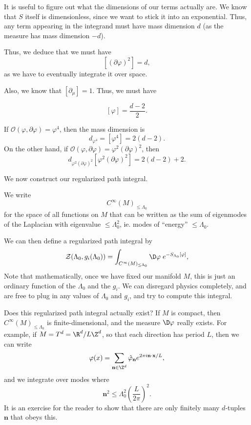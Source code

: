 \documentclass[a4paper]{article}
\begin{document}
It is useful to figure out what the dimensions of our terms actually are. We know that $S$ itself is dimensionless, since we want to stick it into an exponential. Thus, any term appearing in the integrand must have mass dimension $d$ (as the measure has mass dimension $-d$).

Thus, we deduce that we must have
\[
  [(\partial \varphi)^2] = d,
\]
as we have to eventually integrate it over space.

Also, we know that $[\partial_\mu] = 1$. Thus, we must have
\begin{prop}
  \[
    [\varphi] = \frac{d - 2}{2}.
  \]
\end{prop}

\begin{eg}
  If $\mathcal{O}(\varphi, \partial \varphi) = \varphi^4$, then the mass dimension is
  \[
    d_{\varphi^4} = [\varphi^4] = 2 (d - 2).
  \]
  On the other hand, if $\mathcal{O}(\varphi, \partial \varphi) = \varphi^2 (\partial\varphi)^2$, then
  \[
    d_{\varphi^2 (\partial \varphi)^2} [\varphi^2 (\partial \varphi)^2] = 2 (d - 2) + 2.
  \]
\end{eg}
We now construct our regularized path integral.
\begin{notation}
  We write
  \[
    C^\infty(M)_{\leq \Lambda_0}
  \]
  for the space of all functions on $M$ that can be written as the sum of eigenmodes of the Laplacian with eigenvalue $\leq \Lambda_0^2$, ie. modes of ``energy'' $\leq \Lambda_0$.
\end{notation}
We can then define a regularized path integral by
\[
  \mathcal{Z}(\Lambda_0, g_i(\Lambda_0)) = \int_{C^\infty(M)_{\leq \Lambda_0}} \D \varphi\;e^{-S_{\Lambda_0}[\varphi]},
\]
Note that mathematically, once we have fixed our manifold $M$, this is just an ordinary function of the $\Lambda_0$ and the $g_i$. We can disregard physics completely, and are free to plug in any values of $\Lambda_0$ and $g_i$, and try to compute this integral.

Does this regularized path integral actually exist? If $M$ is compact, then $C^\infty(M)_{\leq \Lambda_0}$ is finite-dimensional, and the measure $\D \varphi$ really exists. For example, if $M = T^d = \R^d/L\Z^d$, so that each direction has period $L$, then we can write
\[
  \varphi(x) = \sum_{\mathbf{n} \in \Z^d} \hat{\varphi}_\mathbf{n} e^{2\pi i \mathbf{n}\cdot \mathbf{x}/L},
\]
and we integrate over modes where
\[
  \mathbf{n}^2 \leq \Lambda_0^2 \left(\frac{L}{2\pi}\right)^2.
\]
It is an exercise for the reader to show that there are only finitely many $d$-tuples $\mathbf{n}$ that obeys this.
\end{document}
